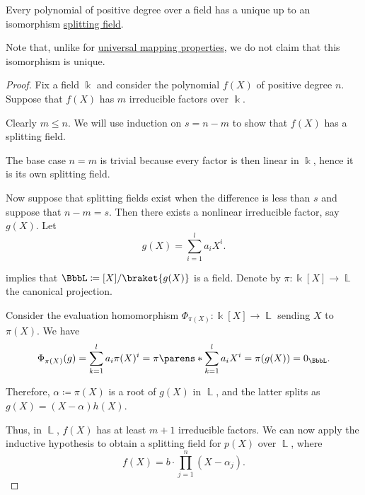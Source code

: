 \begin{proposition}\label{thm:splitting_field_existence}
  Every polynomial of positive degree over a field has a unique up to an isomorphism \hyperref[def:splitting_field]{splitting field}.
\end{proposition}
\begin{comments}
  \item Note that, unlike for \hyperref[rem:universal_mapping_property]{universal mapping properties}, we do not claim that this isomorphism is unique.
\end{comments}
\begin{proof}
  \ExistenceSubProof{} Fix a field \( \Bbbk \) and consider the polynomial \( f(X) \) of positive degree \( n \). Suppose that \( f(X) \) has \( m \) irreducible factors over \( \Bbbk \).

  Clearly \( m \leq n \). We will use induction on \( s = n - m \) to show that \( f(X) \) has a splitting field.

  The base case \( n = m \) is trivial because every factor is then linear in \( \Bbbk \), hence it is its own splitting field.

  Now suppose that splitting fields exist when the difference is less than \( s \) and suppose that \( n - m = s \). Then there exists a nonlinear irreducible factor, say \( g(X) \). Let
  \begin{equation*}
    g(X) = \sum_{i=1}^l a_i X^i.
  \end{equation*}

   implies that \( \BbbL \coloneqq \Bbbk[X] / \braket{ g(X) } \) is a field. Denote by \( \pi: \Bbbk[X] \to \BbbL \) the canonical projection.

  Consider the evaluation homomorphism \( \Phi_{\pi(X)}: \Bbbk[X] \to \BbbL \) sending \( X \) to \( \pi(X) \). We have
  \begin{equation*}
    \Phi_{\pi(X)}(g) = \sum_{k=1}^l a_i \pi(X)^i = \pi\parens*{ \sum_{k=1}^l a_i X^i } = \pi(g(X)) = 0_\BbbL.
  \end{equation*}

  Therefore, \( \alpha \coloneqq \pi(X) \) is a root of \( g(X) \) in \( \BbbL \), and the latter splits as \( g(X) = (X - \alpha) h(X) \).

  Thus, in \( \BbbL \), \( f(X) \) has at least \( m + 1 \) irreducible factors. We can now apply the inductive hypothesis to obtain a splitting field for \( p(X) \) over \( \BbbL \), where
  \begin{equation*}
    f(X) = b \cdot \prod_{j=1}^n (X - \alpha_j).
  \end{equation*}


\end{proof}
